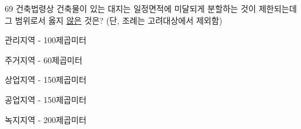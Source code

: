 \begin{question}{69}
건축법령상 건축물이 있는 대지는 일정면적에 미달되게 분할하는 것이 제한되는데 그 범위로서 옳지 \uline{않은} 것은? (단, 조례는 고려대상에서 제외함)
\begin{choices}
  \item 관리지역 - 100제곱미터
  \item 주거지역 - 60제곱미터
  \item 상업지역 - 150제곱미터
  \item 공업지역 - 150제곱미터
  \item 녹지지역 - 200제곱미터
\end{choices}
\end{question}
